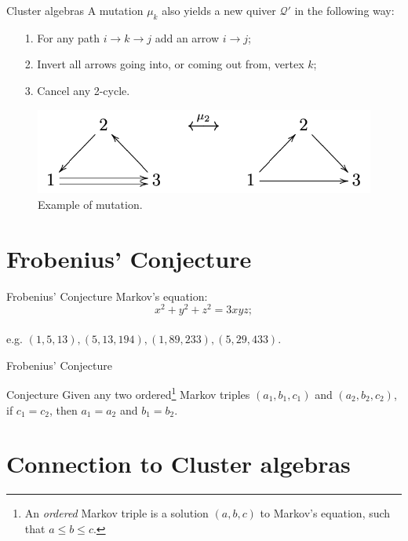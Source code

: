 \documentclass{beamer}
\begin{document}
\begin{frame}{Cluster algebras}
A mutation $\mu_k$ also yields a new quiver $\mathcal{Q}'$ in the following way: \pause
\begin{itemize}
    \item [1.] For any path $i \to k \to j$ add an arrow $i \to j$;\pause
    \item[2.] Invert all arrows going into, or coming out from, vertex $k$; \pause
    \item[3.] Cancel any 2-cycle.
\end{itemize}
\pause
    \begin{figure}[H]
        \centering
        \includegraphics[width = 10 cm]{Images/mutationexample.png}
        \caption{Example of mutation.}
        \label{fig:my_label}
    \end{figure}
\end{frame}
\section{Frobenius' Conjecture}
\begin{frame}{Frobenius' Conjecture}
    Markov's equation:
    \begin{equation*}
        x^2 + y^2 + z^2 = 3xyz;
    \end{equation*}
    \\
\pause
e.g. $(1, 5, 13), (5, 13, 194), (1, 89, 233), (5, 29, 433)$.
\end{frame}

\begin{frame}{Frobenius' Conjecture}
\begin{block}{Conjecture}
Given any two ordered\footnote{An \emph{ordered} Markov triple is a solution $(a,b,c)$ to Markov's equation, such that $a \leq b \leq c$.} Markov triples $(a_1,b_1,c_1)$ and  $(a_2,b_2,c_2)$, if $c_1 = c_2$, then $a_1=a_2$ and $b_1 = b_2$.
\end{block}
\end{frame}

\section{Connection to Cluster algebras}
\end{document}
